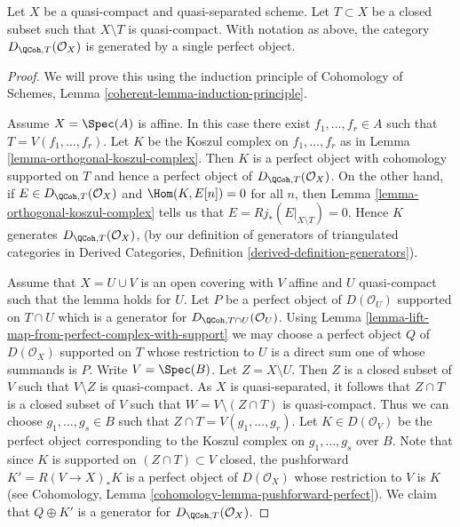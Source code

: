 \begin{lemma}
\label{lemma-generator-with-support}
\begin{reference}
\cite[Theorem 6.8]{Rouquier-dimensions}
\end{reference}
Let $X$ be a quasi-compact and quasi-separated scheme. Let $T \subset X$ be a
closed subset such that $X \setminus T$ is quasi-compact. With notation
as above, the category $D_{\QCoh, T}(\mathcal{O}_X)$ is generated by a
single perfect object.
\end{lemma}

\begin{proof}
We will prove this using the induction principle of
Cohomology of Schemes, Lemma \ref{coherent-lemma-induction-principle}.

\medskip\noindent
Assume $X = \Spec(A)$ is affine. In this case there exist
$f_1, \ldots, f_r \in A$ such that $T = V(f_1, \ldots, f_r)$.
Let $K$ be the Koszul complex on $f_1, \ldots, f_r$ as in
Lemma \ref{lemma-orthogonal-koszul-complex}.
Then $K$ is a perfect object with cohomology supported on
$T$ and hence a perfect object of $D_{\QCoh, T}(\mathcal{O}_X)$.
On the other hand, if $E \in D_{\QCoh, T}(\mathcal{O}_X)$ and
$\Hom(K, E[n]) = 0$ for all $n$, then
Lemma \ref{lemma-orthogonal-koszul-complex}
tells us that $E = Rj_*(E|_{X \setminus T}) = 0$.
Hence $K$ generates $D_{\QCoh, T}(\mathcal{O}_X)$,
(by our definition of generators of triangulated categories in
Derived Categories, Definition \ref{derived-definition-generators}).

\medskip\noindent
Assume that $X = U \cup V$ is an open covering with $V$ affine and
$U$ quasi-compact such that the lemma holds for $U$.
Let $P$ be a perfect object of $D(\mathcal{O}_U)$ supported on $T \cap U$
which is a generator for $D_{\QCoh, T \cap U}(\mathcal{O}_U)$. Using
Lemma \ref{lemma-lift-map-from-perfect-complex-with-support}
we may choose a perfect object $Q$ of $D(\mathcal{O}_X)$ supported on $T$
whose restriction to $U$ is a direct sum one of whose summands is $P$.
Write $V = \Spec(B)$. Let $Z = X \setminus U$. Then $Z$ is a closed subset
of $V$ such that $V \setminus Z$ is quasi-compact. As $X$ is quasi-separated,
it follows that $Z \cap T$ is a closed subset of $V$ such that
$W = V \setminus (Z \cap T)$ is quasi-compact. Thus we can choose
$g_1, \ldots, g_s \in B$ such that $Z \cap T = V(g_1, \ldots, g_r)$.
Let $K \in D(\mathcal{O}_V)$ be the perfect object corresponding to the
Koszul complex on $g_1, \ldots, g_s$ over $B$. Note that since $K$ is
supported on $(Z \cap T) \subset V$ closed, the pushforward
$K' = R(V \to X)_*K$ is a perfect object of $D(\mathcal{O}_X)$ whose
restriction to $V$ is $K$ (see
Cohomology, Lemma \ref{cohomology-lemma-pushforward-perfect}).
We claim that $Q \oplus K'$ is a generator for
$D_{\QCoh, T}(\mathcal{O}_X)$.


\end{proof}
